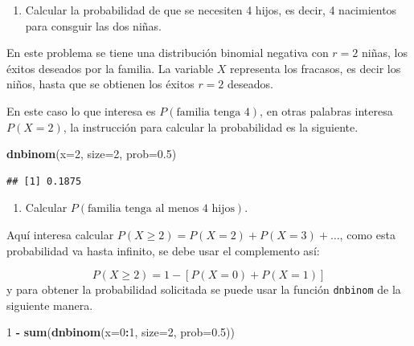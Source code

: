 \documentclass[10pt,]{krantz}
\makeatletter
\newenvironment{Shaded}{\begin{snugshade}}{\end{snugshade}}
\newcommand{\KeywordTok}[1]{\textcolor[rgb]{0.13,0.29,0.53}{\textbf{#1}}}
\newcommand{\DataTypeTok}[1]{\textcolor[rgb]{0.13,0.29,0.53}{#1}}
\newcommand{\DecValTok}[1]{\textcolor[rgb]{0.00,0.00,0.81}{#1}}
\newcommand{\FloatTok}[1]{\textcolor[rgb]{0.00,0.00,0.81}{#1}}
\newcommand{\StringTok}[1]{\textcolor[rgb]{0.31,0.60,0.02}{#1}}
\newcommand{\OperatorTok}[1]{\textcolor[rgb]{0.81,0.36,0.00}{\textbf{#1}}}
\newcommand{\NormalTok}[1]{#1}
\providecommand{\tightlist}{%
  \setlength{\itemsep}{0pt}\setlength{\parskip}{0pt}}
\newenvironment{kframe}{%
\medskip{}
\setlength{\fboxsep}{.8em}
 \def\at@end@of@kframe{}%
 \ifinner\ifhmode%
  \def\at@end@of@kframe{\end{minipage}}%
  \begin{minipage}{\columnwidth}%
 \fi\fi%
 \def\FrameCommand##1{\hskip\@totalleftmargin \hskip-\fboxsep
 \colorbox{shadecolor}{##1}\hskip-\fboxsep
     \hskip-\linewidth \hskip-\@totalleftmargin \hskip\columnwidth}%
 \MakeFramed {\advance\hsize-\width
   \@totalleftmargin\z@ \linewidth\hsize
   \@setminipage}}%
 {\par\unskip\endMakeFramed%
 \at@end@of@kframe}
\renewenvironment{Shaded}{\begin{kframe}}{\end{kframe}}
\makeatother
\begin{document}
\begin{enumerate}
\def\labelenumi{\arabic{enumi})}
\tightlist
\item
  Calcular la probabilidad de que se necesiten 4 hijos, es decir, 4
  nacimientos para consguir las dos niñas.
\end{enumerate}

En este problema se tiene una distribución binomial negativa con \(r=2\)
niñas, los éxitos deseados por la familia. La variable \(X\) representa
los fracasos, es decir los niños, hasta que se obtienen los éxitos
\(r=2\) deseados.

En este caso lo que interesa es \(P(\text{familia tenga 4})\), en otras
palabras interesa \(P(X=2)\), la instrucción para calcular la
probabilidad es la siguiente.

\begin{Shaded}
\begin{Highlighting}[]
\KeywordTok{dnbinom}\NormalTok{(}\DataTypeTok{x=}\DecValTok{2}\NormalTok{, }\DataTypeTok{size=}\DecValTok{2}\NormalTok{, }\DataTypeTok{prob=}\FloatTok{0.5}\NormalTok{)}
\end{Highlighting}
\end{Shaded}

\begin{verbatim}
## [1] 0.1875
\end{verbatim}

\begin{enumerate}
\def\labelenumi{\arabic{enumi})}
\setcounter{enumi}{1}
\tightlist
\item
  Calcular \(P(\text{familia tenga al menos 4 hijos})\).
\end{enumerate}

Aquí interesa calcular \(P(X \geq 2)=P(X=2)+P(X=3)+\ldots\), como esta
probabilidad va hasta infinito, se debe usar el complemento así:

\[P(X \geq 2) = 1 - [P(X=0)+P(X=1)]\] y para obtener la probabilidad
solicitada se puede usar la función \texttt{dnbinom} de la siguiente
manera.

\begin{Shaded}
\begin{Highlighting}[]
\DecValTok{1} \OperatorTok{-}\StringTok{ }\KeywordTok{sum}\NormalTok{(}\KeywordTok{dnbinom}\NormalTok{(}\DataTypeTok{x=}\DecValTok{0}\OperatorTok{:}\DecValTok{1}\NormalTok{, }\DataTypeTok{size=}\DecValTok{2}\NormalTok{, }\DataTypeTok{prob=}\FloatTok{0.5}\NormalTok{))}
\end{Highlighting}
\end{Shaded}
\end{document}

